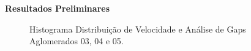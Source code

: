 \documentclass[xcolor=dvipsnames,10pt]{beamer}
\begin{document}
\begin{frame}{\textbf{Resultados Preliminares}}
\begin{figure}[!htbp]
    \caption{Histograma Distribuição de Velocidade e Análise de Gaps Aglomerados 03, 04 e 05.}
  \end{figure}
\end{frame}
\end{document}
